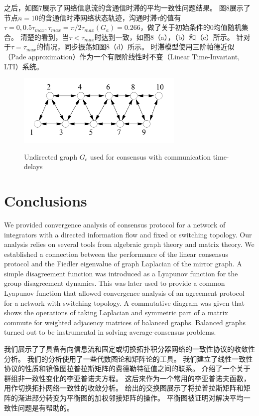 \documentclass{article}
\begin{document}
之后，如图7展示了网络信息流的含通信时滞的平均一致性问题结果。
图8展示了节点$n=10$的含通信时滞网络状态轨迹，沟通时滞$\tau$的值有$\tau=0, 0.5\tau_{max}, \tau_{max} = \pi / 2\tau_{max}(G_a) = 0.266$，做了关于初始条件的0均值随机集合。
清楚的看到，当$\tau < \tau_{max}$时达到一致，如图8（a），（b）和（c）所示。
针对于$\tau = \tau_{max}$的情况，同步振荡如图8（d）所示。
时滞模型使用三阶帕德近似（Pade approximation）作为一个有限阶线性时不变（Linear Time-Invariant, LTI）系统。

\begin{figure}[htbp]
    \centering
    \includegraphics[width=8cm]{figures/Fig7-Undirected.jpeg}
    \label{Undirected}
    \caption{Undirected graph $G_e$ used for consensus with communication time-delays}
\end{figure}

\section{Conclusions}
{\color[gray]{0.5}
\noindent We provided convergence analysis of consensus protocol for a network of integrators with a directed information ﬂow and ﬁxed or switching topology. 
Our analysis relies on several tools from algebraic graph theory and matrix theory. 
We established a connection between the performance of the linear consensus protocol and the Fiedler eigenvalue of graph Laplacian of the mirror graph. 
A simple disagreement function was introduced as a Lyapunov function for the group disagreement dynamics. 
This was later used to provide a common Lyapunov function that allowed convergence analysis of an agreement protocol for a network with switching topology. 
A commutative diagram was given that shows the operations of taking Laplacian and symmetric part of a matrix commute for weighted adjacency matrices of balanced graphs. 
Balanced graphs turned out to be instrumental in solving average-consensus problems.
}

\noindent 我们展示了了具备有向信息流和固定或切换拓扑积分器网络的一致性协议的收敛性分析。
我们的分析使用了一些代数图论和矩阵论的工具。
我们建立了线性一致性协议的性质和镜像图拉普拉斯矩阵的费德勒特征值之间的联系。
介绍了一个关于群组非一致性变化的李亚普诺夫方程。
这后来作为一个常用的李亚普诺夫函数，用作切换拓扑网络一致性的收敛分析。
给出的交换图展示了将拉普拉斯矩阵和矩阵的渐进部分转变为平衡图的加权邻接矩阵的操作。
平衡图被证明对解决平均一致性问题是有帮助的。
\end{document}
